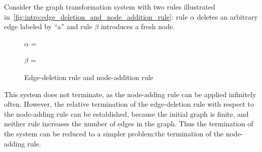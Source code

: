 Consider the graph transformation system with two rules illustrated in~\autoref{fig:intro:edge_deletion_and_node_addition_rule}: rule $\alpha$ deletes an arbitrary edge labeled by \enquote{a} and rule $\beta$ introduces a fresh node.
  \begin{figure}[htbp]
        \centering
        $\alpha$ = {
                    }
    

        $\beta$ ={
                    }
    \caption{Edge-deletion rule and node-addition rule}
    \label{fig:intro:edge_deletion_and_node_addition_rule}
  \end{figure}
  This system does not terminate, as the node-adding rule can be applied infinitely often. However, the relative termination of the edge-deletion rule with respect to the node-adding rule can be established, because the initial graph is finite, and neither rule increases the number of edges in the graph.
  Thus the termination of the system can be reduced to a simpler problem:the termination of the node-adding rule.

